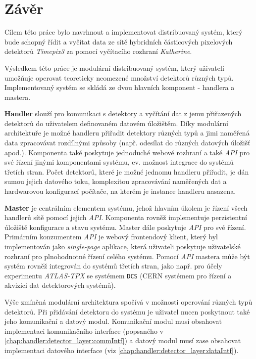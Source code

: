 

\chapter{Závěr}\label{chap:zaver}
Cílem této práce bylo navrhnout a implementovat distribuovaný systém, který bude schopný řídit a vyčítat data ze sítě hybridních částicových pixelových detektorů \textit{Timepix3} za pomocí vyčítacího rozhraní \textit{Katherine}. 

Výsledkem této práce je modulární distribuovaný systém, který uživateli umožňuje operovat teoreticky neomezené množství detektorů různých typů. Implementovaný systém se skládá ze dvou hlavních komponent - handlera a mastera.

\textbf{Handler} slouží pro komunikaci s detektory a vyčítání dat z jemu přiřazených detektorů do uživatelem definovaném datovém úložištěm. Díky modulární architektuře je možné handleru přiřadit detektory různých typů a jimi naměřená data zpracovávat rozdílnými způsoby (např. odesílat do různých datových úložišť apod.). Komponenta také poskytuje jednoduché webové rozhraní a také \textit{API} pro své řízení jinými komponentami systému, ev. možnost integrace do systémů třetích stran. Počet detektorů, které je možné jednomu handleru přiřadit, je dán sumou jejich datového toku, komplexitou zpracovávání naměřených dat a hardwarovou konfigurací počítače, na kterém je instance handleru nasazena.

\textbf{Master} je centrálním elementem systému, jehož hlavním úkolem je řízení všech handlerů sítě pomocí jejich \textit{API}. Komponenta rovněž implementuje perzistentní úložiště konfigurace a stavu systému. Master dále poskytuje \textit{API} pro své řízení. Primárním konzumentem \textit{API} je webový frontendový klient, který byl implementován jako \textit{single-page} aplikace, která uživateli poskytuje uživatelské rozhraní pro plnohodnotné řízení celého systému. Pomocí \textit{API} mastera může být systém rovněž integrován do systémů třetích stran, jako např. pro účely experimentu \textit{ATLAS-TPX} se systémem \texttt{DCS} (CERN systémem pro řízení a akvizici dat detektorových systémů).

Výše zmíněná modulární architektura spočívá v možnosti operování různých typů detektorů. Při přidávání detektoru do systému je uživatel nucen poskytnout také jeho komunikační a datový modul. Komunikační modul musí obsahovat implementaci komunikačního interface (popsaného v \ref{chap:handler:detector_layer:commIntf}) a datový modul musí zase obsahovat implementaci datového interface (viz \ref{chap:handler:detector_layer:dataIntf}).

